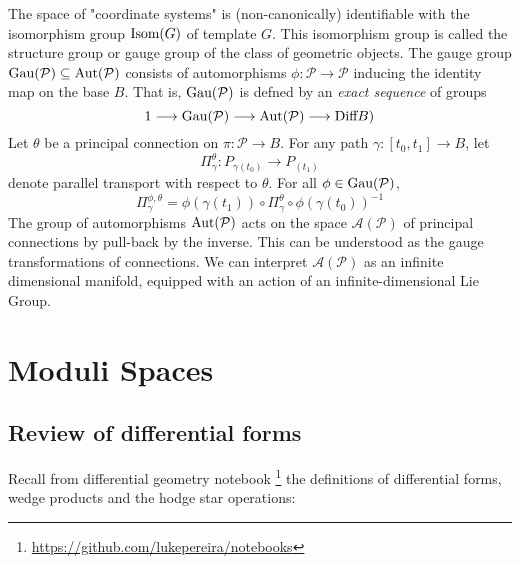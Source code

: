 \documentclass{article}
\theoremstyle{definition}
\begin{document}
    The space of "coordinate systems" is (non-canonically) identifiable with the isomorphism group $\hbox{Isom}(G)$ of template $G$.  This isomorphism group is called the structure group or gauge group of the class of geometric objects. The gauge group $\hbox{Gau}( \mathcal P) \subseteq \hbox{Aut}(\mathcal P)$ consists of automorphisms $ \phi : \mathcal P \rightarrow \mathcal P$ inducing the identity map on the base $B$. That is, $\hbox{Gau}( \mathcal P)$ is defned by an \textit{exact sequence} of groups
    \[
        1 \longrightarrow \hbox{Gau}( \mathcal P) \longrightarrow \hbox{Aut}( \mathcal P) \longrightarrow \hbox{Diff} B)
    \]
    Let $\theta$ be a principal connection on $\pi : \mathcal P \rightarrow B$. For any path $\gamma : [t_0, t_1] \rightarrow B$, let 
    \[
        \Pi^\theta_\gamma : P_{\gamma(t_0)} \rightarrow P_{(t_1)} 
    \]
    denote parallel transport with respect to $\theta$. For all $\phi \in \hbox{Gau}(\mathcal P)$,
    \[
        \Pi_{\gamma}^{\phi,\theta} = \phi(\gamma(t_1)) \circ  \Pi_{\gamma}^{\theta} \circ  \phi(\gamma(t_0))^{-1}
    \]
    The group of automorphisms $\hbox{Aut}( \mathcal P)$ acts on the space $\mathcal A( \mathcal P)$ of principal connections by pull-back by the inverse. This can be understood as the gauge transformations of connections. We can interpret $\mathcal A( \mathcal P)$ as an infinite dimensional manifold, equipped with an action of an infinite-dimensional Lie Group. 


\section{Moduli Spaces}
    \subsection{Review of differential forms}
    Recall from differential geometry notebook \footnote{\url{https://github.com/lukepereira/notebooks}} the definitions of differential forms, wedge products and the hodge star operations:
    
\end{document}
